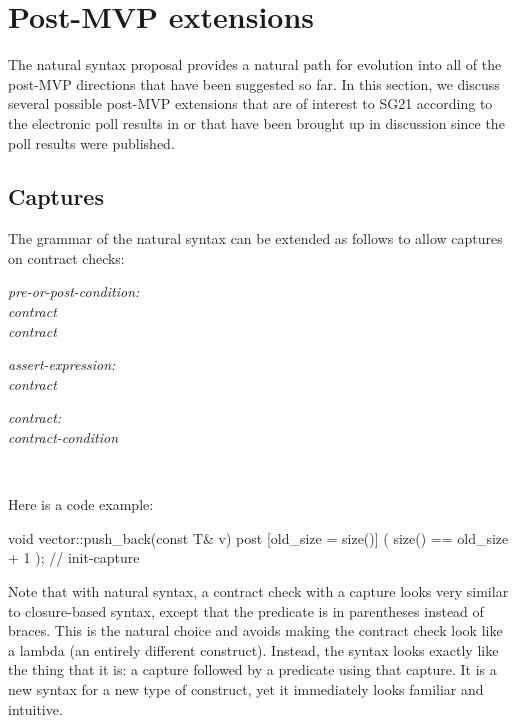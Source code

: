\section{Post-MVP extensions}

The natural syntax proposal provides a natural path for evolution into all of the post-MVP directions that have been suggested so far. In this section, we discuss several possible post-MVP extensions that are of interest to SG21 according to the electronic poll results in \cite{P2885R3} or that have been brought up in discussion since the poll results were published.

\subsection{Captures}
\label{subsec:captures}

The grammar of the natural syntax can be extended as follows to allow captures on contract checks:

\begin{adjustwidth}{0.5cm}{0.5cm}

\emph{pre-or-post-condition:} \\
\phantom{~~~} \emph{contract} \\
\phantom{~~~} \emph{contract}

\emph{assert-expression:} \\
\phantom{~~~} \emph{contract}

\emph{contract:} \\
\phantom{~~~} \emph{contract-condition}

 \\
\phantom{~~~}

\end{adjustwidth}

Here is a code example:

\begin{codeblock}
void vector::push_back(const T& v)
  post [old_size = size()] ( size() == old_size + 1 );  // init-capture
\end{codeblock}

Note that with natural syntax, a contract check with a capture looks very similar to closure-based syntax, except that the predicate is in parentheses instead of braces. This is the natural choice and avoids making the contract check look like a lambda (an entirely different construct). Instead, the syntax looks exactly like the thing that it is: a capture followed by a predicate using that capture. It is a new syntax for a new type of construct, yet it immediately looks familiar and intuitive.

